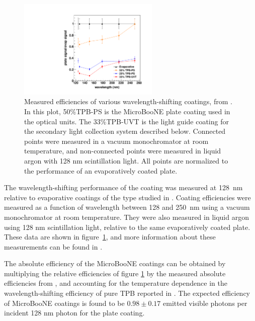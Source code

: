 \begin{figure}[t]
\centering 
\includegraphics[width=0.6\textwidth]{./light_figures/EfficienciesIgnarraThesis.pdf}
\caption{Measured efficiencies of various wavelength-shifting coatings, from \cite{Ignarra:2014yqa}. In this plot, 50\%TPB-PS is the MicroBooNE plate coating used in the optical units.  The 33\%TPB-UVT is the light guide coating for the secondary light collection system described below.  Connected points were measured in a vacuum monochromator at room temperature, and non-connected points were measured in liquid argon with 128 nm scintillation light. All points are normalized to the performance of an evaporatively coated plate. \label{fig:CoatingEfficiency}  }
\end{figure}

The wavelength-shifting performance of the coating was measured at 128~nm relative to evaporative coatings of the type studied in \cite{Gehman:2011}.  Coating efficiencies were measured as a function of wavelength between 128 and 250~nm using a vacuum monochromator at room temperature.  They were also measured in liquid argon using 128 nm scintillation light, relative to the same evaporatively coated plate.  These data are shown in figure~\ref{fig:CoatingEfficiency}, and more information about these measurements can be found in \cite{Ignarra:2014yqa}.  
  
The absolute efficiency of the MicroBooNE coatings can be obtained by multiplying the relative efficiencies of figure \ref{fig:CoatingEfficiency} by the measured absolute efficiencies from \cite{Gehman:2011}, and accounting for the temperature dependence in the wavelength-shifting efficiency of pure TPB reported in \cite{Francini:2013-jinst}.  The expected efficiency of MicroBooNE coatings is found to be $0.98 \pm 0.17$ emitted visible photons per incident 128 nm photon for the plate coating.


